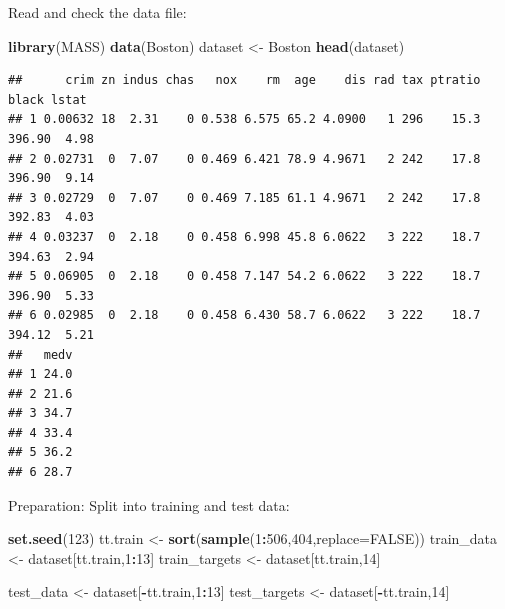 \documentclass[
  10pt,
  ignorenonframetext,
  twocolumn]{beamer}
\newenvironment{Shaded}{\begin{snugshade}}{\end{snugshade}}
\newcommand{\AttributeTok}[1]{\textcolor[rgb]{0.13,0.29,0.53}{#1}}
\newcommand{\ConstantTok}[1]{\textcolor[rgb]{0.56,0.35,0.01}{#1}}
\newcommand{\DecValTok}[1]{\textcolor[rgb]{0.00,0.00,0.81}{#1}}
\newcommand{\FunctionTok}[1]{\textcolor[rgb]{0.13,0.29,0.53}{\textbf{#1}}}
\newcommand{\NormalTok}[1]{#1}
\newcommand{\OtherTok}[1]{\textcolor[rgb]{0.56,0.35,0.01}{#1}}
\newcommand{\SpecialCharTok}[1]{\textcolor[rgb]{0.81,0.36,0.00}{\textbf{#1}}}
\begin{document}
\begin{frame}[fragile]
Read and check the data file:

\scriptsize

\begin{Shaded}
\begin{Highlighting}[]
\FunctionTok{library}\NormalTok{(MASS)}
\FunctionTok{data}\NormalTok{(Boston)}
\NormalTok{dataset }\OtherTok{\textless{}{-}}\NormalTok{ Boston}
\FunctionTok{head}\NormalTok{(dataset)}
\end{Highlighting}
\end{Shaded}

\begin{verbatim}
##      crim zn indus chas   nox    rm  age    dis rad tax ptratio  black lstat
## 1 0.00632 18  2.31    0 0.538 6.575 65.2 4.0900   1 296    15.3 396.90  4.98
## 2 0.02731  0  7.07    0 0.469 6.421 78.9 4.9671   2 242    17.8 396.90  9.14
## 3 0.02729  0  7.07    0 0.469 7.185 61.1 4.9671   2 242    17.8 392.83  4.03
## 4 0.03237  0  2.18    0 0.458 6.998 45.8 6.0622   3 222    18.7 394.63  2.94
## 5 0.06905  0  2.18    0 0.458 7.147 54.2 6.0622   3 222    18.7 396.90  5.33
## 6 0.02985  0  2.18    0 0.458 6.430 58.7 6.0622   3 222    18.7 394.12  5.21
##   medv
## 1 24.0
## 2 21.6
## 3 34.7
## 4 33.4
## 5 36.2
## 6 28.7
\end{verbatim}

\normalsize

Preparation: Split into training and test data:

\scriptsize

\begin{Shaded}
\begin{Highlighting}[]
\FunctionTok{set.seed}\NormalTok{(}\DecValTok{123}\NormalTok{)}
\NormalTok{tt.train }\OtherTok{\textless{}{-}} \FunctionTok{sort}\NormalTok{(}\FunctionTok{sample}\NormalTok{(}\DecValTok{1}\SpecialCharTok{:}\DecValTok{506}\NormalTok{,}\DecValTok{404}\NormalTok{,}\AttributeTok{replace=}\ConstantTok{FALSE}\NormalTok{))}
\NormalTok{train\_data }\OtherTok{\textless{}{-}}\NormalTok{ dataset[tt.train,}\DecValTok{1}\SpecialCharTok{:}\DecValTok{13}\NormalTok{]}
\NormalTok{train\_targets }\OtherTok{\textless{}{-}}\NormalTok{ dataset[tt.train,}\DecValTok{14}\NormalTok{]}

\NormalTok{test\_data }\OtherTok{\textless{}{-}}\NormalTok{ dataset[}\SpecialCharTok{{-}}\NormalTok{tt.train,}\DecValTok{1}\SpecialCharTok{:}\DecValTok{13}\NormalTok{]}
\NormalTok{test\_targets }\OtherTok{\textless{}{-}}\NormalTok{ dataset[}\SpecialCharTok{{-}}\NormalTok{tt.train,}\DecValTok{14}\NormalTok{]}
\end{Highlighting}
\end{Shaded}
\end{frame}
\end{document}

